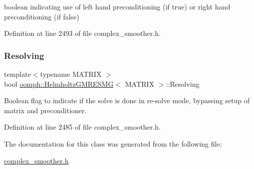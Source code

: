 boolean indicating use of left hand preconditioning (if true) or right hand preconditioning (if false) 



Definition at line 2493 of file complex\+\_\+smoother.\+h.

\mbox{\label{classoomph_1_1HelmholtzGMRESMG_acb64519b62c16bbec32d01c9969f746f}} 
\subsubsection{\texorpdfstring{Resolving}{Resolving}}
{\footnotesize\ttfamily template$<$typename M\+A\+T\+R\+IX $>$ \\
bool \hyperlink{classoomph_1_1HelmholtzGMRESMG}{oomph\+::\+Helmholtz\+G\+M\+R\+E\+S\+MG}$<$ M\+A\+T\+R\+IX $>$\+::Resolving\hspace{0.3cm}{\ttfamily [protected]}}



Boolean flag to indicate if the solve is done in re-\/solve mode, bypassing setup of matrix and preconditioner. 



Definition at line 2485 of file complex\+\_\+smoother.\+h.



The documentation for this class was generated from the following file\+:\begin{DoxyCompactItemize}
\item 
\hyperlink{complex__smoother_8h}{complex\+\_\+smoother.\+h}\end{DoxyCompactItemize}

